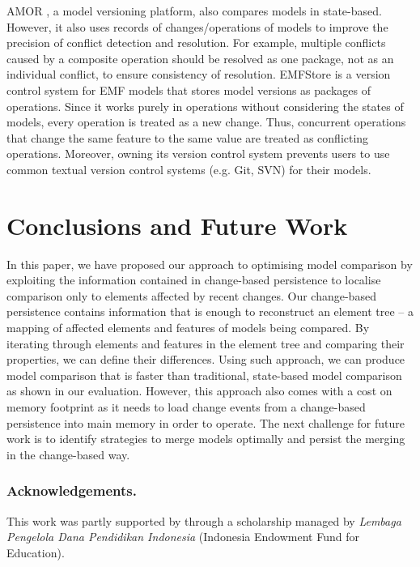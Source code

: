 \documentclass{llncs}
\begin{document}
AMOR \cite{DBLP:conf/sfm/BroschKLSWW12}, a model versioning platform, also compares models in state-based. However, it also uses records of changes/operations of models to improve the precision of conflict detection and resolution. For example, multiple conflicts caused by a composite operation should be resolved as one package, not as an individual conflict, to ensure consistency of resolution. EMFStore \cite{koegel2010emfstore} is a version control system for EMF models that stores model versions as packages of operations. Since it works purely in operations without considering the states of models, every operation is treated as a new change. Thus, concurrent operations that change the same feature to the same value are treated as conflicting operations. Moreover, owning its version control system prevents users to use common textual version control systems (e.g. Git, SVN) for their models.  


\section{Conclusions and Future Work}
\label{sec:conclusion_and_future_work}
In this paper, we have proposed our approach to optimising model comparison by exploiting the information contained in change-based persistence to localise comparison only to elements affected by recent changes. Our change-based persistence contains information that is enough to reconstruct an element tree -- a mapping of affected elements and features of models being compared. By iterating through elements and features in the element tree and comparing their properties, we can define their differences. Using such approach, we can produce model comparison that is faster than traditional, state-based model comparison as shown in our evaluation. However, this approach also comes with a cost on memory footprint as it needs to load change events from a change-based persistence into main memory in order to operate. The next challenge for future work is to identify strategies to merge models optimally and persist the merging in the change-based way. 

\vspace{-10pt}
\subsubsection*{Acknowledgements.} This work was partly supported by through a scholarship managed by \emph{Lembaga Pengelola Dana Pendidikan Indonesia} (Indonesia Endowment Fund for Education).

 

\end{document}
